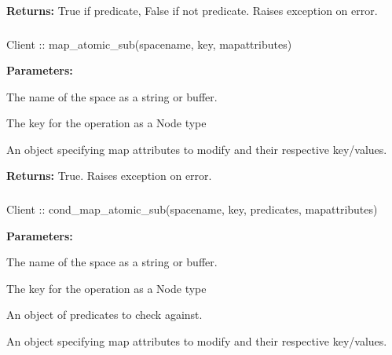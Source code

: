 \noindent\textbf{Returns:}
True if predicate, False if not predicate.  Raises exception on error.

\subsubsection{}
\label{api:nodejs:map_atomic_sub}
\begin{javascriptcode}
Client :: map_atomic_sub(spacename, key, mapattributes)
\end{javascriptcode}


\noindent\textbf{Parameters:}
\begin{description}[labelindent=\widthof{{\code{mapattributes}}},leftmargin=*,noitemsep,nolistsep,align=right]
\item[\code{spacename}] The name of the space as a string or buffer.
\item[\code{key}] The key for the operation as a Node type
\item[\code{mapattributes}] An object specifying map attributes to modify and their respective key/values.
\end{description}

\noindent\textbf{Returns:}
True.  Raises exception on error.

\subsubsection{}
\label{api:nodejs:cond_map_atomic_sub}
\begin{javascriptcode}
Client :: cond_map_atomic_sub(spacename, key, predicates, mapattributes)
\end{javascriptcode}


\noindent\textbf{Parameters:}
\begin{description}[labelindent=\widthof{{\code{mapattributes}}},leftmargin=*,noitemsep,nolistsep,align=right]
\item[\code{spacename}] The name of the space as a string or buffer.
\item[\code{key}] The key for the operation as a Node type
\item[\code{predicates}] An object of predicates to check against.
\item[\code{mapattributes}] An object specifying map attributes to modify and their respective key/values.
\end{description}

